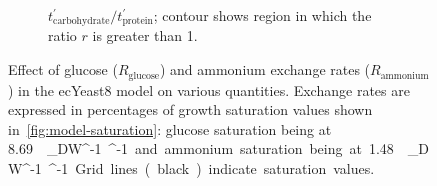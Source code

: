 \begin{figure}
\begin{subfigure}[t]{0.45\textwidth}
    \caption{
      $t_{\mathrm{carbohydrate}}^{\prime}/t_{\mathrm{protein}}^{\prime}$;
      contour shows region in which the ratio $r$ is greater than 1.
    }
    \label{fig:model-grid-glc-carb-to-prot}
  \end{subfigure}
  \caption{
    Effect of glucose ($R_{\mathrm{glucose}}$) and ammonium exchange rates ($R_{{\mathrm{ammonium}}}$) in the ecYeast8 model on various quantities.
    Exchange rates are expressed in percentages of growth saturation values shown in~\ref{fig:model-saturation}: glucose saturation being at \SI{8.69}{\milli\mole~\gram_{DW}^{-1}~\hour^{-1}} and ammonium saturation being at \SI{1.48}{\milli\mole~\gram_{DW}^{-1}~\hour^{-1}}.
    Grid lines (black) indicate saturation values.
  }
  \label{fig:model-grid-glc}
\end{figure}


